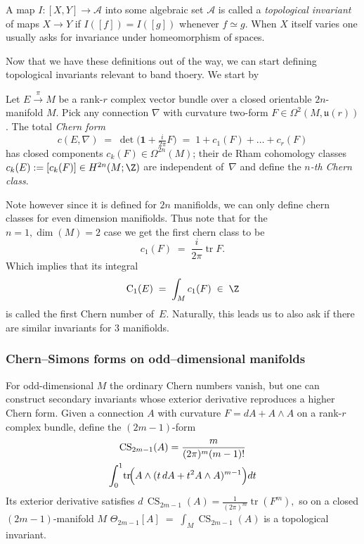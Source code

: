 \documentclass[aps,prb,twocolumn]{revtex4-2}
\begin{document}
      \begin{definition}
        A map $I\colon[X,Y]\to \mathcal{A}$ into some algebraic set $\mathcal{A}$ is called a \emph{topological invariant} of maps $X\to Y$ if $I([f])=I([g])$ whenever $f\simeq g$.  When $X$ itself varies one usually asks for invariance under homeomorphism of spaces.
      \end{definition}

      Now that we have these definitions out of the way, we can start defining topological invariants relevant to band thoery. We start by

      \begin{definition}
        Let $E\!\xrightarrow{\;\pi\;}M$ be a rank-$r$ complex vector bundle over a closed orientable $2n$-manifold $M$. Pick any connection $\nabla$ with curvature two-form $F\in\Omega^2(M,\mathfrak{u}(r))$. The total \emph{Chern form}
        \[ c(E,\nabla)\;=\;\det\!\bigl(\mathbf 1+\tfrac{i}{2\pi}F\bigr) \;=\;1+c_1(F)+\dots+c_r(F) \]
        has closed components $c_k(F)\in\Omega^{2n}(M)$; their de Rham cohomology classes $c_k(E):=[c_k(F)]\in H^{2n}(M;\Z)$ are independent of~$\nabla$ and define the \emph{$n$-th Chern class}.
      \end{definition}

      Note however since it is defined for $2n$ manifiolds, we can only define chern classes for even dimension manifiolds. Thus note that for the $n=1,\dim(M)=2$ case we get the first chern class to be
      \[ c_1(F)\;=\;\frac{i}{2\pi}\operatorname{tr}F. \]
      Which implies that its integral
      \[ \mathrm{C}_1(E)\;=\;\int_M c_1(F)\;\in\;\Z \]
      is called the first Chern number of~$E$. Naturally, this leads us to also ask if there are similar invariants for $3$ manifiolds. 

      \subsubsection{Chern--Simons forms on odd--dimensional manifolds}

      For odd-dimensional $M$ the ordinary Chern numbers vanish,
      but one can construct secondary invariants whose exterior
      derivative reproduces a higher Chern form.  Given a connection
      $A$ with curvature $F=dA+A\wedge A$ on a rank-$r$ complex bundle,
      define the $(2m\!-\!1)$-form
      \begin{multline}
        \operatorname{CS}_{2m-1}(A) =\frac{m}{(2\pi)^m(m-1)!}\\
      \int_0^1\!\operatorname{tr} \!\Bigl(A\wedge  (t\,dA + t^{2} A\wedge A)^{m-1}\Bigr)dt
      \end{multline}
      Its exterior derivative satisfies
      \( d\,\operatorname{CS}_{2m-1}(A)=\tfrac1{(2\pi)^{m}}\operatorname{tr}(F^{m}), \)
      so on a closed $(2m\!-\!1)$-manifold $M$
      \(\displaystyle \Theta_{2m-1}[A]\;=\;\int_{M}\!\operatorname{CS}_{2m-1}(A) \)
      is a topological invariant.
\end{document}

